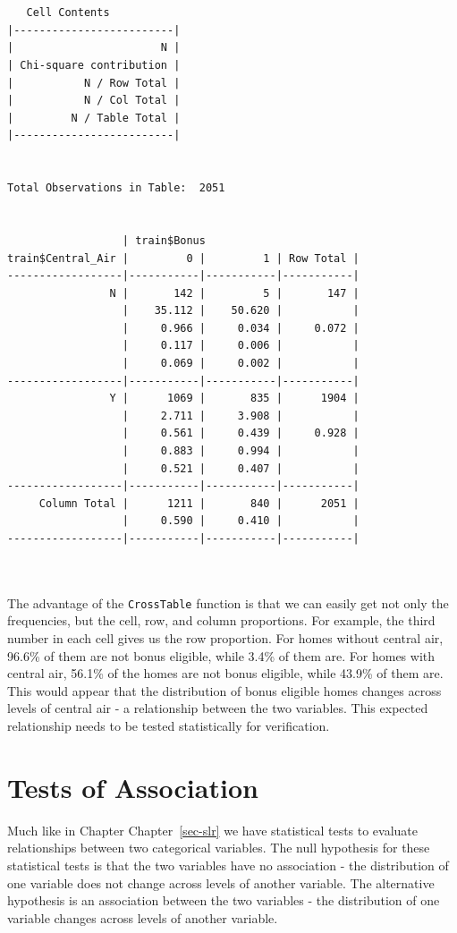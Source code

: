 \documentclass[
  letterpaper,
  DIV=11,
  numbers=noendperiod]{scrreprt}
\begin{document}
\begin{verbatim}

 
   Cell Contents
|-------------------------|
|                       N |
| Chi-square contribution |
|           N / Row Total |
|           N / Col Total |
|         N / Table Total |
|-------------------------|

 
Total Observations in Table:  2051 

 
                  | train$Bonus 
train$Central_Air |         0 |         1 | Row Total | 
------------------|-----------|-----------|-----------|
                N |       142 |         5 |       147 | 
                  |    35.112 |    50.620 |           | 
                  |     0.966 |     0.034 |     0.072 | 
                  |     0.117 |     0.006 |           | 
                  |     0.069 |     0.002 |           | 
------------------|-----------|-----------|-----------|
                Y |      1069 |       835 |      1904 | 
                  |     2.711 |     3.908 |           | 
                  |     0.561 |     0.439 |     0.928 | 
                  |     0.883 |     0.994 |           | 
                  |     0.521 |     0.407 |           | 
------------------|-----------|-----------|-----------|
     Column Total |      1211 |       840 |      2051 | 
                  |     0.590 |     0.410 |           | 
------------------|-----------|-----------|-----------|

 
\end{verbatim}

The advantage of the \texttt{CrossTable} function is that we can easily
get not only the frequencies, but the cell, row, and column proportions.
For example, the third number in each cell gives us the row proportion.
For homes without central air, 96.6\% of them are not bonus eligible,
while 3.4\% of them are. For homes with central air, 56.1\% of the homes
are not bonus eligible, while 43.9\% of them are. This would appear that
the distribution of bonus eligible homes changes across levels of
central air - a relationship between the two variables. This expected
relationship needs to be tested statistically for verification.

\hypertarget{tests-of-association}{%
\section{Tests of Association}\label{tests-of-association}}

Much like in Chapter Chapter~\ref{sec-slr} we have statistical tests to
evaluate relationships between two categorical variables. The null
hypothesis for these statistical tests is that the two variables have no
association - the distribution of one variable does not change across
levels of another variable. The alternative hypothesis is an association
between the two variables - the distribution of one variable changes
across levels of another variable.
\end{document}
